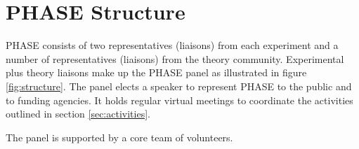 \section{PHASE Structure}
\label{sec:structure}
PHASE consists of two representatives (liaisons) from each experiment and a number of representatives (liaisons) from the theory community. Experimental plus theory liaisons make up the PHASE panel as illustrated in figure \ref{fig:structure}. The panel elects a speaker to represent PHASE to the public and to funding agencies. It holds regular virtual meetings to coordinate the activities outlined in section \ref{sec:activities}. 

The panel is supported by a core team of volunteers.
